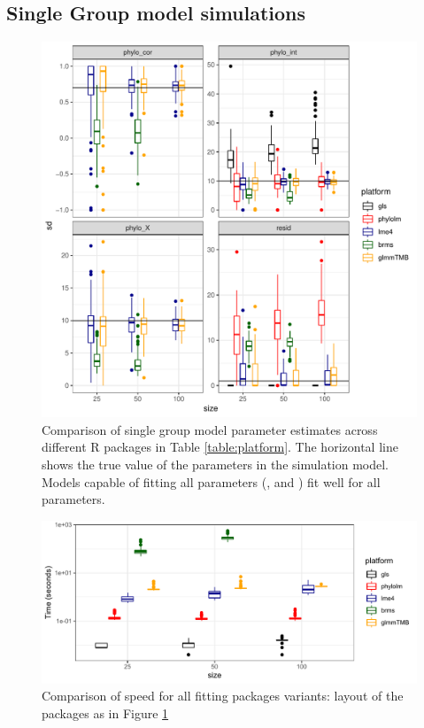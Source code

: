 \documentclass[12pt]{article}
\begin{document}
\subsection*{Single Group model simulations}

\begin{center}
\begin{figure}[H]
  \includegraphics[scale=0.8,page=1]{./git_push/plot.Rout.pdf}
  \caption{Comparison of single group model parameter estimates across different R packages in Table \ref{table:platform}. The horizontal line shows the true value of the parameters in the simulation model. Models capable of fitting all parameters (,  and ) fit well for all parameters.} 
\label{ssplot}
\end{figure}
\end{center}


\begin{center}
\begin{figure}[H]
  \includegraphics[scale=0.8]{./figure/sstime.pdf}
  \caption{Comparison of speed for all fitting packages variants: layout of the packages as in Figure \ref{ssplot}}
\label{ssplot_speed}
\end{figure}
\end{center}
\end{document}
